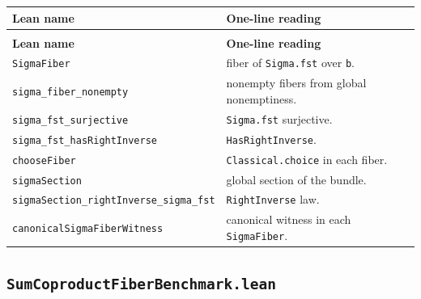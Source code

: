 \documentclass[11pt]{article}
\begin{document}
{\footnotesize
\begin{longtable}{@{}>{\raggedright\arraybackslash}p{}>{\raggedright\arraybackslash}p{}@{}}
\toprule
\textbf{Lean name} & \textbf{One-line reading} \\
\midrule
\endfirsthead
\multicolumn{2}{c}{\textit{(continued)}} \\
\toprule
\textbf{Lean name} & \textbf{One-line reading} \\
\midrule
\endhead
\bottomrule
\endlastfoot

\texttt{SigmaFiber} & fiber of \texttt{Sigma.fst} over \texttt{b}. \\
\texttt{sigma\_fiber\_nonempty} & nonempty fibers from global nonemptiness. \\
\texttt{sigma\_fst\_surjective} & \texttt{Sigma.fst} surjective. \\
\texttt{sigma\_fst\_hasRightInverse} & \texttt{HasRightInverse}. \\
\texttt{chooseFiber} & \texttt{Classical.choice} in each fiber. \\
\texttt{sigmaSection} & global section of the bundle. \\
\texttt{sigmaSection\_rightInverse\_sigma\_fst} & \texttt{RightInverse} law. \\
\texttt{canonicalSigmaFiberWitness} & canonical witness in each \texttt{SigmaFiber}. \\

\end{longtable}
}

\subsection*{\texttt{SumCoproductFiberBenchmark.lean}}
\end{document}
